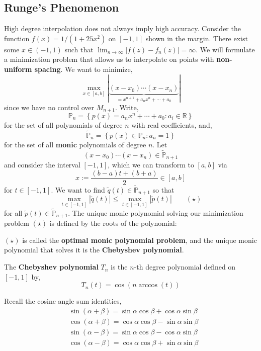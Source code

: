 \subsection{Runge's Phenomenon}
High degree interpolation does not always imply high accuracy. Consider the function $f(x)=1/(1+25 x^2)$ on $[-1,1]$ shown in the margin. There exist some $x \in (-1,1)$ such that $\lim _{n \rightarrow \infty}\left|f(z)-f_n(z)\right|=\infty$. We will formulate a minimization problem that allows us to interpolate on points with \textbf{non-uniform spacing}. We want to minimize,
\[\max _{x \in[a, b]}|\underbrace{\left(x-x_0\right) \cdots\left(x-x_n\right)}_{=x^{n+1}+a_n x^n+\cdots+a_0}|\]
since we have no control over $M_{n+1}$. Write,
\[\mathbb{P}_n=\left\{p(x)=a_n x^n+\cdots+a_0: a_i \in \mathbb{R}\right\}\]
for the set of all polynomials of degree $n$ with real coefficients, and,
\[\tilde{\mathbb{P}}_n=\left\{p(x) \in \mathbb{P}_n: a_n=1\right\}\]
for the set of all \textbf{monic} polynomials of degree $n$. Let
\[\left(x-x_0\right) \cdots\left(x-x_n\right) \in \tilde{\mathbb{P}}_{n+1}\]
and consider the interval $[-1,1]$, which we can transform to $[a,b]$ via
\[x:=\frac{(b-a) t+(b+a)}{2} \in[a, b]\]
for $t \in[-1,1]$. We want to find $\tilde{q}(t) \in \tilde{\mathbb{P}}_{n+1}$ so that
\[\max _{t \in[-1,1]}|\tilde{q}(t)| \leq \max _{t \in[-1,1]}|\tilde{p}(t)| \quad \quad (\star)\]
for all $\tilde{p}(t) \in \tilde{\mathbb{P}}_{n+1}$. The unique monic polynomial solving our minimization problem $(\star)$ is defined by the roots of the polynomial:

\begin{marginfigure}
    $(\star)$ is called the \textbf{optimal monic polynomial problem}, and the unique monic polynomial that solves it is the \textbf{Chebyshev polynomial}.
\end{marginfigure}

\begin{defn}
    \sloppy The \textbf{Chebyshev polynomial} $T_n$ is the $n$-th degree polynomial defined on $[-1,1]$ by,
    \[T_n(t)=\cos (n \arccos (t))\]
\end{defn}

\begin{marginfigure}
Recall the cosine angle sum identities,
\begin{align*}
&\sin (\alpha+\beta)=\sin \alpha \cos \beta+\cos \alpha \sin \beta \\
&\cos (\alpha+\beta)=\cos \alpha \cos \beta-\sin \alpha \sin \beta \\
&\sin (\alpha-\beta)=\sin \alpha \cos \beta-\cos \alpha \sin \beta \\
&\cos (\alpha-\beta)=\cos \alpha \cos \beta+\sin \alpha \sin \beta
\end{align*}
\end{marginfigure}

